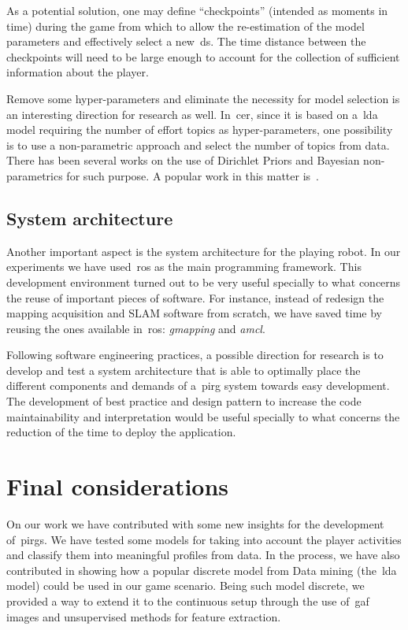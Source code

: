 As a potential solution, one may define ``checkpoints'' (intended as moments in time) during the game from which to allow the re-estimation of the model parameters and effectively select a new~\gls{ds}. The time distance between the checkpoints will need to be large enough to account for the collection of sufficient information about the player.

Remove some hyper-parameters and eliminate the necessity for model selection is an interesting direction for research as well. In~\gls{cer}, since it is based on a~\gls{lda} model requiring the number of effort topics as hyper-parameters, one possibility is to use a non-parametric approach and select the number of topics from data. There has been several works on the use of Dirichlet Priors and Bayesian non-parametrics for such purpose. A popular work in this matter is~\cite{teh_sharing_2005}. 

\subsection{System architecture}
Another important aspect is the system architecture for the playing robot. In our experiments we have used~\gls{ros} as the main programming framework. This development environment turned out to be very useful specially to what concerns the reuse of important pieces of software. For instance, instead of redesign the  mapping acquisition and SLAM software from scratch, we have saved time by reusing the ones available in~\gls{ros}: \textit{gmapping} and \textit{amcl}. 

Following software engineering practices, a possible direction for research is to develop and test a system architecture that is able to optimally place the different components and demands of a~\gls{pirg} system towards easy development. The development of best practice and design pattern to increase the code maintainability and interpretation would be useful specially to what concerns the reduction of the time to deploy the application.

\section{Final considerations}
On our work we have contributed with some new insights for the development of~\gls{pirg}s. We have tested some models for taking into account the player activities and classify them into meaningful profiles from data. In the process, we have also contributed in showing how a popular discrete model from Data mining (the~\gls{lda} model) could be used in our game scenario. Being such model discrete, we provided a way to extend it to the continuous setup through the use of~\gls{gaf} images and unsupervised methods for feature extraction.

